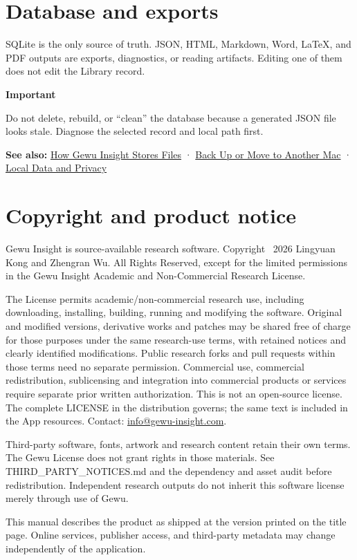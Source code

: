 \documentclass[10pt,letterpaper,oneside]{scrreprt}
\newenvironment{GewuRelated}{\par\nobreak\vspace{3pt}\nobreak\begingroup\small\sffamily\begin{samepage}\noindent}{\par\end{samepage}\endgroup}
\renewenvironment{quote}
  {\Needspace{5\baselineskip}\begin{tcolorbox}[enhanced,breakable,colback=GewuPale,colframe=GewuPale,boxrule=0pt,
    borderline west={1.6pt}{0pt}{GewuBlue},arc=1.2mm,left=2.5mm,right=2.5mm,top=1.7mm,bottom=1.7mm,
    before skip=4pt,after skip=5pt,fontupper=\color{GewuInk}\small]}
  {\end{tcolorbox}}
\begin{document}
\section{Database and exports}\label{database-and-exports}

SQLite is the only source of truth. JSON, HTML, Markdown, Word, LaTeX, and PDF outputs are exports, diagnostics, or reading artifacts. Editing one of them does not edit the Library record.

\begin{quote}
\textbf{Important}

Do not delete, rebuild, or ``clean'' the database because a generated JSON file looks stale. Diagnose the selected record and local path first.
\end{quote}

\begin{GewuRelated}
\textbf{See also:} \hyperref[storage-model]{How Gewu Insight Stores Files} · \hyperref[backup-migrate]{Back Up or Move to Another Mac} · \hyperref[privacy]{Local Data and Privacy}
\end{GewuRelated}

\clearpage
\section*{Copyright and product notice}
Gewu Insight is source-available research software. Copyright \textcopyright\ 2026 Lingyuan Kong and Zhengran Wu. All Rights Reserved, except for the limited permissions in the Gewu Insight Academic and Non-Commercial Research License.

The License permits academic/non-commercial research use, including downloading, installing, building, running and modifying the software. Original and modified versions, derivative works and patches may be shared free of charge for those purposes under the same research-use terms, with retained notices and clearly identified modifications. Public research forks and pull requests within those terms need no separate permission. Commercial use, commercial redistribution, sublicensing and integration into commercial products or services require separate prior written authorization. This is not an open-source license. The complete LICENSE in the distribution governs; the same text is included in the App resources. Contact: \href{mailto:info@gewu-insight.com}{info@gewu-insight.com}.

Third-party software, fonts, artwork and research content retain their own terms. The Gewu License does not grant rights in those materials. See THIRD\_PARTY\_NOTICES.md and the dependency and asset audit before redistribution. Independent research outputs do not inherit this software license merely through use of Gewu.

This manual describes the product as shipped at the version printed on the title page. Online services, publisher access, and third-party metadata may change independently of the application.
\end{document}
